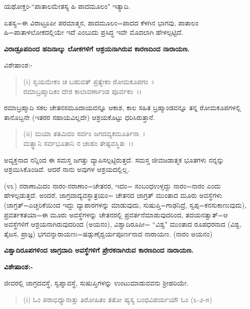 ಯಥೋಕ್ತಂ-``ಪಾತಾಲಮೇತಸ್ಯ ಹಿ ಪಾದಮೂಲಂ" ಇತ್ಯಾದಿ.

ಏತಸ್ಯ=ಈ ವಿರಾಟ್ರೂಪೀ ಪರಮಾತ್ಮನ, ಪಾದಮೂಲಂ=ಪಾದದ ಕೆಳಗಿನ ಭಾಗವು, ಪಾತಾಲಂ ಹಿ=ಪಾತಾಳಲೋಕದಲ್ಲಿಯೇ ಇದೆ ಎಂಬುದು ಪ್ರಸಿದ್ಧ ಇವೇ ಮೊದಲಾಗಿ ಹೇಳಲ್ಪಟ್ಟಿದೆ.

\begin{center}
\textbf{ವಿರಾಡ್ರೂಪದಿಂದ ಹದಿನಾಲ್ಕು ಲೋಕಗಳಿಗೆ ಆಶ್ರಯನಾಗಿರುವ ಕಾರಣದಿಂದ ನಾರಾಯಣ.}
\end{center}

\noindent
ವಿಶೇಷಾಂಶ:-

\begin{verse}
(i) ಸ್ವಯಮೇಕಂ ಚ ಬಹುವತ್ ಪ್ರತ್ಯೇಕಂ ರೋಮಕೂಪಗಂ~।\\ ರಮಾಬ್ರಹ್ಮಾದಿಕಂ ದೇಶ ಕಾಲಾವರ್ಣಾಂಡ ಪೂರ್ವಕಂ~।।
\end{verse}


ರಮಾಬ್ರಹ್ಮಾದಿ ಸಕಲ ಚೇತನಸಮೂದಾಯವನ್ನೂ ಆಕಾಶ, ಕಾಲ ಸಹಿತ ಬ್ರಹ್ಮಾಂಡವನ್ನೂ ತನ್ನ ರೋಮಕೂಪಗಳಲ್ಲಿ ತಾನೊಬ್ಬನೇ (ಇತರರ ಸಹಾಯವಿಲ್ಲದೇ) ಆಶ್ರಯಕೊಟ್ಟು ಧರಿಸಿರುತ್ತಾನೆ.

\begin{verse}
(ii) ಮಯಾ ತತಮಿದಂ ಸರ್ವಂ ಜಗದವ್ಯಕಮೂರ್ತಿನಾ~।\\ ಮತ್ಸ್ಥಾನಿ ಸರ್ವಭೂತಾನಿ ನ ಚಾಹಂ ತೇಷ್ಟವಸ್ಥಿತಃ~।।
\end{verse}

ಅವ್ಯಕ್ತನಾದ ನನ್ನಿಂದ ಈ ಸಮಸ್ತ ಜಗತ್ತು ವ್ಯಾಪಿಸಲ್ಪಟ್ಟಿರುತ್ತದೆ. ಸಮಸ್ತ ಜೀವಜಡಾತ್ಮಕ ಭೂತಗಳು ನನ್ನನ್ನು ಆಶ್ರಯಿಸಿಕೊಂಡಿವೆ. ಆದರೆ ನಾನು ಅವುಗಳ ಆಶ್ರಯದಲ್ಲಿಲ್ಲ.

(೪೩) ನರಾಣಾಮಿದಂ ನಾರಂ-ನರಾಣಾಂ=ಚೇತನರ, ಇದಂ= ಸಂಬಂಧಉಳ್ಳದ್ದು ನಾರಂ=ನಾರಂ ಎಂದು ಹೇಳಲ್ಪಡುತ್ತದೆ. ಅಂದರೆ, ಜಾಗ್ರದಾದ್ಯವಸ್ಥಾತ್ರಯಂ= ಚೇತನದ ಜಾಗ್ರತ್ ಮುಂತಾದ ಮೂರು ಅವಸ್ಥೆಗಳು (ಜಾಗ್ರತ್=ಎಚ್ಚರಿಕೆಯಿಂದ ಇದ್ದು ವ್ಯಾಪಾರಗಳನ್ನು ಮಾಡುವುದು, ಸುಷುಪ್ತಿ=ಗಾಢನಿದ್ರೆ, ಸ್ವಪ್ಪ=ಕನಸುಕಾಣುವುದು), ಪ್ರವರ್ತಕತಯಾ=ಈ ಮೂರು ಅವಸ್ಥೆಗಳನ್ನು ಚೇತನರಲ್ಲಿ ಪ್ರವರ್ತನೆಮಾಡುವುದರಿಂದ, ತದಯನತ್ವಾತ್=ಆ ಅವಸ್ಥೆಗಳಿಗೆ ಆಶ್ರಯನಾಗಿರುವುದರಿಂದ (ಅಯನಂ), ವಿಶ್ವಾದಿರೂಪೀ= ``ವಿಶ್ವ" ಮುಂತಾದ ರೂಪಧರನಾದ (ವಿಶ್ವ, ತೈಜಸ, ಪ್ರಾಜ್ಞ) ಭಗವನ್ನಾರಾಯಣಃ=ಷಡ್ಗುಣೈಶ್ವರ್ಯಪೂರ್ಣನಾದ ನಾರಾಯಣ. (ನಾರಂ ಅಯನಂ)

\begin{center}
\textbf{ವಿಶ್ವಾದಿರೂಪಗಳಿಂದ ಜಾಗ್ರದಾದಿ ಅವಸ್ಥೆಗಳಿಗೆ ಪ್ರೇರಕನಾಗಿರುವ ಕಾರಣದಿಂದ ನಾರಾಯಣ.}
\end{center}

\noindent
\textbf{ವಿಶೇಷಾಂಶ:-}

ಜೀವರಲ್ಲಿ ಜಾಗ್ರದವಸ್ಥೆ, ಸ್ವಪ್ನಾವಸ್ಥೆ, ಸುಷುಪ್ತಿಗಳನ್ನು ಉಂಟುಮಾಡುವವನು ಶ‍್ರೀಹರಿಯೇ.

\begin{verse}
(i) ಓಂ ಪರಾಭಿಧ್ಯಾನಾತ್ತು ತಿರೋಹಿತಂ ತತೋ ಹ್ಯಸ್ಯ ಬಂಧವಿಪರ್ಯಯೌ ಓಂ (೩-೨-೫)
\end{verse}

